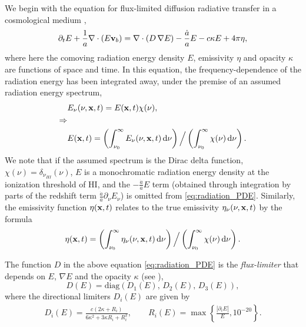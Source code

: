 \documentclass[letterpaper,10pt]{article}
\renewcommand{\(}{\left(}
\renewcommand{\)}{\right)}
\newcommand{\vb}{{\bf v}_b}
\newcommand{\xvec}{{\bf x}}
\begin{document}
We begin with the equation for flux-limited diffusion radiative
transfer in a cosmological medium \cite{ReynoldsHayesPaschosNorman2009},
\begin{equation}
\label{eq:radiation_PDE}
  \partial_{t} E + \frac1a \nabla\cdot\(E\vb\) =
    \nabla\cdot\(D\,\nabla E\) - \frac{\dot{a}}{a} E - c\kappa E + 4\pi\eta,
\end{equation}
where here the comoving radiation energy density $E$, emissivity
$\eta$ and opacity $\kappa$ are functions of space and time.  In this
equation, the frequency-dependence of the radiation energy has been
integrated away, under the premise of an assumed radiation energy
spectrum, 
\begin{align}
  \notag
  & E_{\nu}(\nu,\xvec,t) = E(\xvec,t) \chi(\nu), \\
  \notag
  \Rightarrow & \\
  \label{eq:spectrum}
  & E(\xvec,t) = \(\int_{\nu_0}^{\infty} E_{\nu}(\nu,\xvec,t)\,\mathrm{d}\nu \)
    \Big/ \( \int_{\nu_0}^{\infty} \chi(\nu)\,\mathrm{d}\nu \).
\end{align}
We note that if the assumed spectrum is the Dirac delta function,
$\chi(\nu) = \delta_{\nu_{HI}}(\nu)$, $E$ is a monochromatic radiation
energy density at the ionization threshold of HI, and the
$-\frac{\dot{a}}{a}E$ term (obtained through integration by parts of
the redshift term $\frac{\dot{a}}{a}\partial_{\nu}E_{\nu}$) is omitted
from \eqref{eq:radiation_PDE}. Similarly, the emissivity function 
$\eta(\xvec,t)$ relates to the true emissivity
$\eta_{\nu}(\nu,\xvec,t)$ by the formula
\begin{equation}
\label{eq:emissivity}
  \eta(\xvec,t) = \( \int_{\nu_0}^{\infty}\eta_{\nu}(\nu,\xvec,t)\,\mathrm{d}\nu \) 
  \Big/ \( \int_{\nu_0}^{\infty}\chi(\nu)\,\mathrm{d}\nu \).
\end{equation}

The function $D$ in the above equation \eqref{eq:radiation_PDE} is
the {\em flux-limiter} that depends on $E$, $\nabla E$ and the 
opacity $\kappa$ (see
\cite{HayesNorman2003,ReynoldsHayesPaschosNorman2009}),  
\[
   D(E) = \text{diag}\( D_1(E),\, D_2(E),\, D_3(E) \),
\]
where the directional limiters $D_i(E)$ are given by
\begin{align}
  \label{eq:Zeus_limiter}
   D_i(E) = \frac{c(2\kappa+R_i)}{6\kappa^2+3\kappa R_i+R_i^2}, \qquad
   R_i(E) = \max\left\{\frac{|\partial_i E|}{E}, 10^{-20} \right\}.
\end{align}
\end{document}
